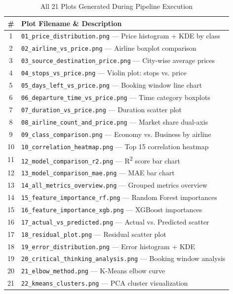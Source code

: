 \documentclass[12pt, a4paper]{article}
\begin{document}
\begin{table}[H]
\centering
\caption{All 21 Plots Generated During Pipeline Execution}
\begin{tabular}{c l}
\toprule
\textbf{\#} & \textbf{Plot Filename \& Description} \\
\midrule
1  & \texttt{01\_price\_distribution.png} — Price histogram + KDE by class \\
2  & \texttt{02\_airline\_vs\_price.png} — Airline boxplot comparison \\
3  & \texttt{03\_source\_destination\_price.png} — City-wise average prices \\
4  & \texttt{04\_stops\_vs\_price.png} — Violin plot: stops vs. price \\
5  & \texttt{05\_days\_left\_vs\_price.png} — Booking window line chart \\
6  & \texttt{06\_departure\_time\_vs\_price.png} — Time category boxplots \\
7  & \texttt{07\_duration\_vs\_price.png} — Duration scatter plot \\
8  & \texttt{08\_airline\_count\_and\_price.png} — Market share dual-axis \\
9  & \texttt{09\_class\_comparison.png} — Economy vs. Business by airline \\
10 & \texttt{10\_correlation\_heatmap.png} — Top 15 correlation heatmap \\
11 & \texttt{12\_model\_comparison\_r2.png} — R\textsuperscript{2} score bar chart \\
12 & \texttt{13\_model\_comparison\_mae.png} — MAE bar chart \\
13 & \texttt{14\_all\_metrics\_overview.png} — Grouped metrics overview \\
14 & \texttt{15\_feature\_importance\_rf.png} — Random Forest importances \\
15 & \texttt{16\_feature\_importance\_xgb.png} — XGBoost importances \\
16 & \texttt{17\_actual\_vs\_predicted.png} — Actual vs. Predicted scatter \\
17 & \texttt{18\_residual\_plot.png} — Residual scatter plot \\
18 & \texttt{19\_error\_distribution.png} — Error histogram + KDE \\
19 & \texttt{20\_critical\_thinking\_analysis.png} — Booking window analysis \\
20 & \texttt{21\_elbow\_method.png} — K-Means elbow curve \\
21 & \texttt{22\_kmeans\_clusters.png} — PCA cluster visualization \\
\bottomrule
\end{tabular}
\end{table}
\end{document}
